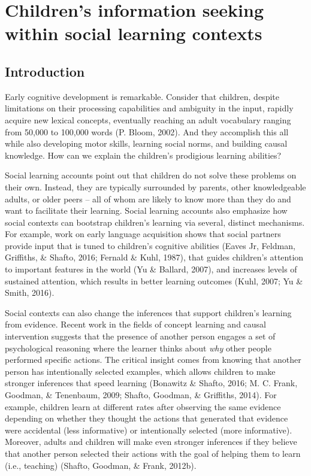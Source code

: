 \documentclass[oneside]{report}
\begin{document}
\chapter{Children's information seeking within social learning
contexts}\label{childrens-information-seeking-within-social-learning-contexts}


\section{Introduction}\label{introduction}

Early cognitive development is remarkable. Consider that children,
despite limitations on their processing capabilities and ambiguity in
the input, rapidly acquire new lexical concepts, eventually reaching an
adult vocabulary ranging from 50,000 to 100,000 words (P. Bloom, 2002).
And they accomplish this all while also developing motor skills,
learning social norms, and building causal knowledge. How can we explain
the children's prodigious learning abilities?

Social learning accounts point out that children do not solve these
problems on their own. Instead, they are typically surrounded by
parents, other knowledgeable adults, or older peers -- all of whom are
likely to know more than they do and want to facilitate their learning.
Social learning accounts also emphasize how social contexts can
bootstrap children's learning via several, distinct mechanisms. For
example, work on early language acquisition shows that social partners
provide input that is tuned to children's cognitive abilities (Eaves Jr,
Feldman, Griffiths, \& Shafto, 2016; Fernald \& Kuhl, 1987), that guides
children's attention to important features in the world (Yu \& Ballard,
2007), and increases levels of sustained attention, which results in
better learning outcomes (Kuhl, 2007; Yu \& Smith, 2016).

Social contexts can also change the inferences that support children's
learning from evidence. Recent work in the fields of concept learning
and causal intervention suggests that the presence of another person
engages a set of psychological reasoning where the learner thinks about
\emph{why} other people performed specific actions. The critical insight
comes from knowing that another person has intentionally selected
examples, which allows children to make stronger inferences that speed
learning (Bonawitz \& Shafto, 2016; M. C. Frank, Goodman, \& Tenenbaum,
2009; Shafto, Goodman, \& Griffiths, 2014). For example, children learn
at different rates after observing the same evidence depending on
whether they thought the actions that generated that evidence were
accidental (less informative) or intentionally selected (more
informative). Moreover, adults and children will make even stronger
inferences if they believe that another person selected their actions
with the goal of helping them to learn (i.e., teaching) (Shafto,
Goodman, \& Frank, 2012b).
\end{document}
